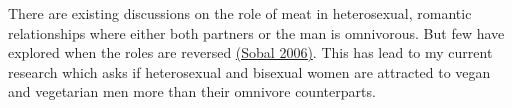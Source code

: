 There are existing discussions on the role of meat in heterosexual, romantic relationships where either both partners or the man is omnivorous. But few have explored when the roles are reversed \hyperlink{sobal}{(Sobal 2006)}. This has lead to my current research which asks if heterosexual and bisexual women are attracted to vegan and vegetarian men more than their omnivore counterparts.

\restoregeometry
